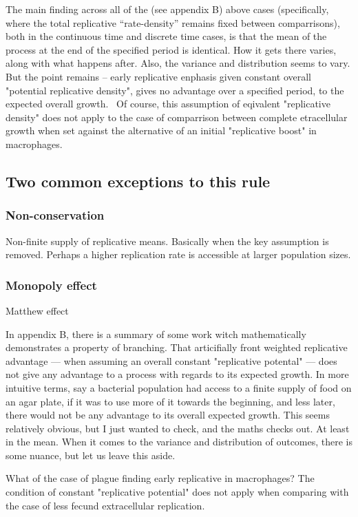 
The main finding across all of the (see appendix B) above cases (specifically, where the total replicative ``rate-density'' remains fixed between comparrisons), both in the continuous time and discrete time cases, is that the mean of the process at the end of the specified period is identical.  How it gets there varies, along with what happens after. Also, the variance and distribution seems to vary.  But the point remains -- early replicative enphasis given constant overall "potential replicative density", gives no advantage over a specified period, to the expected overall growth. \ 
Of course, this assumption of eqivalent "replicative density" does not apply to the case of comparrison between complete etracellular growth when set against the alternative of an initial "replicative boost" in macrophages. 











\subsection*{Two common exceptions to this rule}

\subsubsection{Non-conservation}
Non-finite supply of replicative means. Basically when the key assumption is removed. Perhaps a higher replication rate is accessible at larger population sizes.



\subsubsection{Monopoly effect}
Matthew effect






In appendix B, there is a summary of some work witch mathematically demonstrates a property of branching. That articifially front weighted replicative advantage --- when assuming an overall constant "replicative potental" --- does not give any advantage to a process with regards to its expected growth. In more intuitive terms, say a bacterial population had access to a finite supply of food on an agar plate, if it was to use more of it towards the beginning, and less later, there would not be any advantage to its overall expected growth. This seems relatively obvious, but I just wanted to check, and the maths checks out. At least in the mean. When it comes to the variance and distribution of outcomes, there is some nuance,  but let us leave this aside. \par 

What of the case of plague finding early replicative in macrophages? The condition of constant "replicative potential" does not apply when comparing with the case of less fecund extracellular replication.
